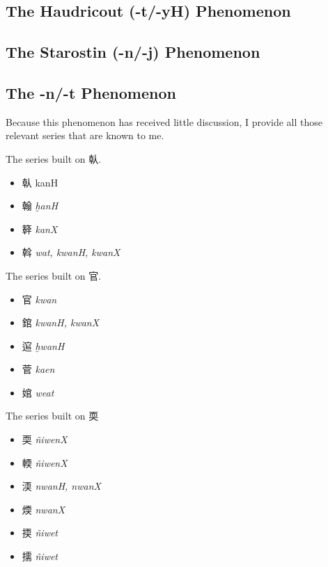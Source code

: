 \subsection{The Haudricout (-t/-yH) Phenomenon}

\subsection{The Starostin (-n/-j) Phenomenon}


\subsection{The -n/-t Phenomenon}
Because this phenomenon has received little discussion, I provide all those relevant series that are known to me. 

The series built on 倝. 
\begin{itemize}
\item  {\Large{倝}} kanH
 \item {\Large{翰}} \textit{ḫanH}
\item  {\Large{簳}} \textit{kanX}
 \item {\Large{斡}}  \emph{{wat, kwanH}, kwanX} %
\end{itemize}

The series built on 官.

\begin{itemize}
\item {\Large{官}} \textit{kwan}
\item {\Large{錧}} \textit{kwanH, kwanX}
\item {\Large{逭}} \textit{ḫwanH}
\item {\Large{菅}} \textit{kaen}
\item {\Large{婠}}  \textit{{}weat}
\end{itemize}

The series built on 耎
\begin{itemize}
\item
{\Large{耎}} \textit{ñiwenX}
\item
{\Large{輭}} \textit{ñiwenX}
\item
{\Large{渜}} \textit{nwanH, nwanX}
\item
{\Large{煗}} \textit{nwanX}
\item
{\Large{㨎}} \textit{ñiwet}
\item
{\Large{擩}} \textit{ñiwet}
\end{itemize}

